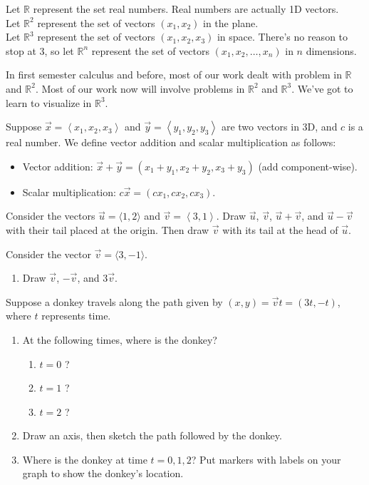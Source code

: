 \begin{definition}
Let $\mathbb{R}$ represent the set real numbers. Real numbers are actually 1D vectors.\\
Let $\mathbb{R}^2$ represent the set of vectors $(x_1,x_2)$ in the plane.\\
Let $\mathbb{R}^3$ represent the set of vectors $(x_1,x_2,x_3)$ in space. There's no reason to stop at 3, so let $\mathbb{R}^n$ represent the set of vectors $(x_1,x_2,\ldots,x_n)$ in $n$ dimensions.
\end{definition}
In first semester calculus and before, most of our work dealt with problem in $\mathbb{R}$ and $\mathbb{R}^2$. Most of our work now will involve problems in $\mathbb{R}^2$ and $\mathbb{R}^3$. We've got to learn to visualize in $\mathbb{R}^3$.

\begin{definition}\label{def:vecadd}
Suppose $\vec x=\left<x_1,x_2,x_3\right>$ and $\vec y=\left<y_1,y_2,y_3\right>$ are two vectors in 3D, and $c$ is a real number. We define vector addition and scalar multiplication as follows:
\begin{itemize}
\item Vector addition: $\vec x+\vec y = (x_1+y_1,x_2+y_2,x_3+y_3)$ (add component-wise).
\item Scalar multiplication: $c\vec x = (cx_1,cx_2,cx_3)$.
\end{itemize}
\end{definition}

\begin{problem}
Consider the vectors $\vec u=\langle 1,2 \rangle$ and $\vec v=\left<3,1\right>$.  Draw $\vec u$, $\vec v$, $\vec u+\vec v$, and $\vec u-\vec v$ with their tail placed at the origin.  Then draw $\vec v$ with its tail at the head of $\vec u$. 
\end{problem}

\begin{problem}\label{prob:donkey}
Consider the vector $\vec v=\langle 3,-1 \rangle $.\\
\begin{enumerate}
\item Draw $\vec v$, $-\vec v$, and $3\vec v$.
\end{enumerate}
\noindent Suppose a donkey travels along the path given by $(x,y)=\vec v t = (3t,-t)$, where $t$ represents time.
\begin{enumerate}[resume]
\item At the following times, where is the donkey?
	\begin{enumerate}
		\item $t=0$ ?
		\item $t=1$ ?
		\item $t=2$ ?
	\end{enumerate}
\item Draw an axis, then sketch the path followed by the donkey. 
\item Where is the donkey at time $t=0,1,2$? Put markers with labels on your graph to show the donkey's location.
\end{enumerate}
\end{problem}

